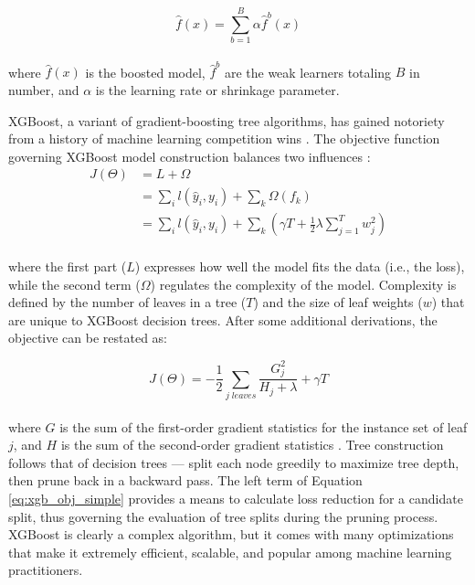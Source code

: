 \begin{equation}
\label{eq:xgb_form}
    \hat{f}(x) = \sum_{b=1}^{B}{\alpha \hat{f}^{b}(x)}
\end{equation}
\\
where $\hat{f}(x)$ is the boosted model, $\hat{f}^b$ are the weak learners totaling $B$ in number, and $\alpha$ is the learning rate or shrinkage parameter. 

XGBoost, a variant of gradient-boosting tree algorithms, has gained notoriety from a history of machine learning competition wins \citep{chen_dmlcxgboost_2021}. The objective function governing XGBoost model construction balances two influences \citep{chen_xgboost_2016}:
\begin{equation}
\label{eq:xgb_objective}
\begin{aligned}
    J(\Theta) &= L + \Omega \\
    &= \sum_{i}{l(\hat{y}_i,y_i)}+\sum_{k}{\Omega(f_k)} \\
    &= \sum_{i}{l(\hat{y}_i,y_i)}+\sum_{k}{\left({\gamma T}+\frac{1}{2} \lambda \sum_{j=1}^T{w_j^2}\right)}
\end{aligned}
\end{equation}
\\
where the first part ($L$) expresses how well the model fits the data (i.e., the loss), while the second term ($\Omega$) regulates the complexity of the model. Complexity is defined by the number of leaves in a tree ($T$) and the size of leaf weights ($w$) that are unique to XGBoost decision trees. After some additional derivations, the objective can be restated as:

\begin{equation}
\label{eq:xgb_obj_simple}
    J(\Theta) = -\frac{1}{2}\sum_{j\;leaves}{\frac{G_j^2}{H_j + \lambda} + \gamma T}
\end{equation}
\\
where $G$ is the sum of the first-order gradient statistics for the instance set of leaf $j$, and $H$ is the sum of the second-order gradient statistics \citep{chen_xgboost_2016}. Tree construction follows that of decision trees --- split each node greedily to maximize tree depth, then prune back in a backward pass. The left term of Equation \ref{eq:xgb_obj_simple} provides a means to calculate loss reduction for a candidate split, thus governing the evaluation of tree splits during the pruning process. XGBoost is clearly a complex algorithm, but it comes with many optimizations that make it extremely efficient, scalable, and popular among machine learning practitioners.

